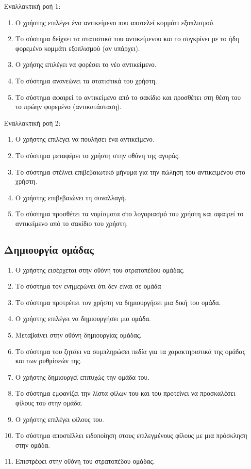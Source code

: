 Εναλλακτική ροή 1:
\begin{enumerate}[label=3.\alph*.,ref=3.\alph*]
\item Ο χρήστης επιλέγει ένα αντικείμενο που αποτελεί κομμάτι εξοπλισμού.
\item Το σύστημα δείχνει τα στατιστικά του αντικείμενου και το συγκρίνει με το ήδη φορεμένο κομμάτι εξοπλισμού (αν υπάρχει).
\item O χρήσης επιλέγει να φορέσει το νέο αντικείμενο.
\item Το σύστημα ανανεώνει τα στατιστικά του χρήστη.
\item Το σύστημα αφαιρεί το αντικείμενο από το σακίδιο και προσθέτει στη θέση του το πρώην φορεμένο (αντικατάσταση).
\end{enumerate}

Εναλλακτική ροή 2:
\begin{enumerate}[label=5.\alph*.,ref=5.\alph*]
\item Ο χρήστης επιλέγει να πουλήσει ένα αντικείμενο.
\item Το σύστημα μεταφέρει το χρήστη στην οθόνη της αγοράς.
\item Το σύστημα στέλνει επιβεβαιωτικό μήνυμα για την πώληση του αντικειμένου στο χρήστη.
\item Ο χρήστης επιβεβαιώνει τη συναλλαγή.
\item Το σύστημα προσθέτει τα νομίσματα στο λογαριασμό του χρήστη και αφαιρεί το αντικείμενο από το σακίδιο του χρήστη.
\end{enumerate}

\newpage
\subsection{Δημιουργία ομάδας}
\label{sec:createclan}
\begin{enumerate}
\item Ο χρήστης εισέρχεται στην οθόνη του στρατοπέδου ομάδας.
\item Το σύστημα τον ενημερώνει ότι δεν είναι σε ομάδα
\item Το σύστημα προτρέπει τον χρήστη να δημιουργήσει μια δική του ομάδα.
\item Ο χρήστης επιλέγει να δημιουργήσει μια ομάδα.
\item Μεταβαίνει στην οθόνη δημιουργίας ομάδας.
\item Το σύστημα του ζητάει να συμπληρώσει πεδία για τα χαρακτηριστικά της ομάδας και των ρυθμίσεών της.
\item Ο χρήστης δημιουργεί επιτυχώς την ομάδα του.
\item Το σύστημα εμφανίζει την λίστα φίλων του και του προτείνει να προσκαλέσει φίλους του στην ομάδα.
\item Ο χρήστης επιλέγει φίλους του.
\item Το σύστημα αποστέλλει ειδοποίηση στους επιλεγμένους φίλους με μια πρόσκληση στην ομάδα.
\item Επιστρέφει στην οθόνη του στρατοπέδου ομάδας.
\end{enumerate}

